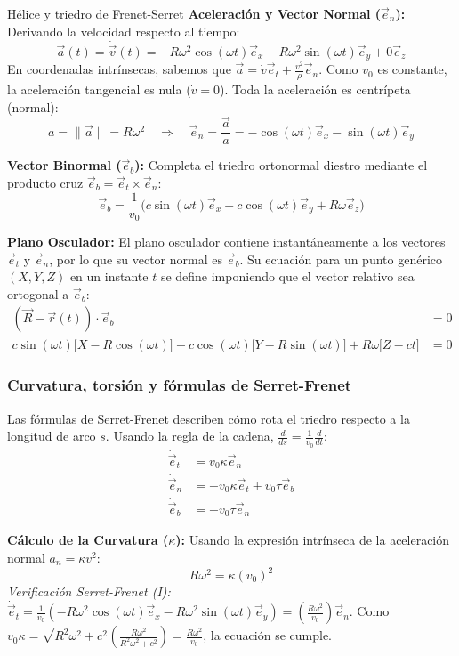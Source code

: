 \begin{solucion}{Hélice y triedro de Frenet-Serret}
\textbf{Aceleración y Vector Normal ($\vec{e}_n$):}
Derivando la velocidad respecto al tiempo:
$$\vec{a}(t) = \dot{\vec{v}}(t) = -R\omega^2\cos(\omega t)\vec{e}_x - R\omega^2\sin(\omega t)\vec{e}_y + 0\vec{e}_z$$
En coordenadas intrínsecas, sabemos que $\vec{a} = \dot{v}\vec{e}_t + \frac{v^2}{\rho}\vec{e}_n$. Como $v_0$ es constante, la aceleración tangencial es nula ($\dot{v}=0$). Toda la aceleración es centrípeta (normal):
$$a = \|\vec{a}\| = R\omega^2 \quad \Rightarrow \quad \vec{e}_n = \frac{\vec{a}}{a} = -\cos(\omega t)\vec{e}_x - \sin(\omega t)\vec{e}_y$$

\textbf{Vector Binormal ($\vec{e}_b$):}
Completa el triedro ortonormal diestro mediante el producto cruz $\vec{e}_b = \vec{e}_t \times \vec{e}_n$:
$$\vec{e}_b = \frac{1}{v_0}\Big( c\sin(\omega t)\vec{e}_x - c\cos(\omega t)\vec{e}_y + R\omega\vec{e}_z \Big)$$

\textbf{Plano Osculador:}
El plano osculador contiene instantáneamente a los vectores $\vec{e}_t$ y $\vec{e}_n$, por lo que su vector normal es $\vec{e}_b$. Su ecuación para un punto genérico $(X,Y,Z)$ en un instante $t$ se define imponiendo que el vector relativo sea ortogonal a $\vec{e}_b$:
\begin{align*}
    (\vec{R} - \vec{r}(t)) \cdot \vec{e}_b &= 0  \\
    c\sin(\omega t)\big[X - R\cos(\omega t)\big] - c\cos(\omega t)\big[Y - R\sin(\omega t)\big] + R\omega\big[Z - ct\big] &= 0
\end{align*}


\subsubsection*{Curvatura, torsión y fórmulas de Serret-Frenet}
Las fórmulas de Serret-Frenet describen cómo rota el triedro respecto a la longitud de arco $s$. Usando la regla de la cadena, $\frac{d}{ds} = \frac{1}{v_0} \frac{d}{dt}$:
\begin{align*}
    \dot{\vec{e}}_t &= v_0 \kappa \vec{e}_n \tag{I} \\
    \dot{\vec{e}}_n &= -v_0 \kappa \vec{e}_t + v_0 \tau \vec{e}_b \tag{II} \\
    \dot{\vec{e}}_b &= -v_0 \tau \vec{e}_n \tag{III}
\end{align*}

\textbf{Cálculo de la Curvatura ($\kappa$):}
Usando la expresión intrínseca de la aceleración normal $a_n = \kappa v^2$:
$$R\omega^2 = \kappa (v_0)^2$$
\textit{Verificación Serret-Frenet (I):} 
$\dot{\vec{e}}_t = \frac{1}{v_0}(-R\omega^2\cos(\omega t)\vec{e}_x - R\omega^2\sin(\omega t)\vec{e}_y) = \left(\frac{R\omega^2}{v_0}\right) \vec{e}_n$. 
Como $v_0 \kappa = \sqrt{R^2\omega^2 + c^2} \left(\frac{R\omega^2}{R^2\omega^2 + c^2}\right) = \frac{R\omega^2}{v_0}$, la ecuación se cumple.


\end{solucion}
